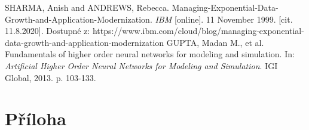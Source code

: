 \documentclass[11pt,twoside,openright]{report}
\begin{document}
\begin{thebibliography}{L}
SHARMA, Anish and ANDREWS, Rebecca. Managing-Exponential-Data-Growth-and-Application-Modernization. \textit{IBM} [online]. 11 November 1999. [cit. 11.8.2020]. Dostupné z: https://www.ibm.com/cloud/blog/managing-exponential-data-growth-and-application-modernization 
GUPTA, Madan M., et al. Fundamentals of higher order neural networks for modeling and simulation. In: \textit{Artificial Higher Order Neural Networks for Modeling and Simulation}. IGI Global, 2013. p. 103-133.
\end{thebibliography}



\clearpage
\chapter*{Příloha}
\begin{appendices}

\end{appendices}
\end{document}
